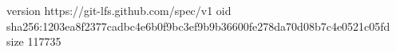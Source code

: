 version https://git-lfs.github.com/spec/v1
oid sha256:1203ea8f2377cadbc4e6b0f9bc3ef9b9b36600fe278da70d08b7c4e0521c05fd
size 117735
